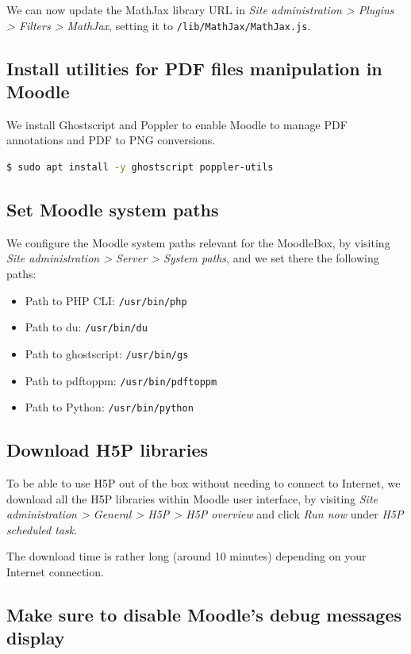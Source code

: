 \documentclass[12pt]{article}
\begin{document}
We can now update the MathJax library URL in \emph{Site administration > Plugins > Filters > MathJax}, setting it to \lstinline{/lib/MathJax/MathJax.js}.

\subsection{Install utilities for PDF files manipulation in Moodle}

We install Ghostscript and Poppler to enable Moodle to manage PDF annotations and PDF to PNG conversions.
\begin{lstlisting}[language=bash]
$ sudo apt install -y ghostscript poppler-utils
\end{lstlisting}

\subsection{Set Moodle system paths}

We configure the Moodle system paths relevant for the MoodleBox, by visiting \emph{Site administration > Server > System paths}, and we set there the following paths:
\begin{itemize}
\item Path to PHP CLI: \texttt{/usr/bin/php}
\item Path to du: \texttt{/usr/bin/du}
\item Path to ghostscript: \texttt{/usr/bin/gs}
\item Path to pdftoppm: \texttt{/usr/bin/pdftoppm}
\item Path to Python: \texttt{/usr/bin/python}
\end{itemize}

\subsection{Download H5P libraries}

To be able to use H5P out of the box without needing to connect to Internet, we download all the H5P libraries within Moodle user interface, by visiting \emph{Site administration > General > H5P > H5P overview} and click \emph{Run now} under \emph{H5P scheduled task}.

The download time is rather long (around 10 minutes) depending on your Internet connection.

\subsection{Make sure to disable Moodle's debug messages display}
\end{document}
